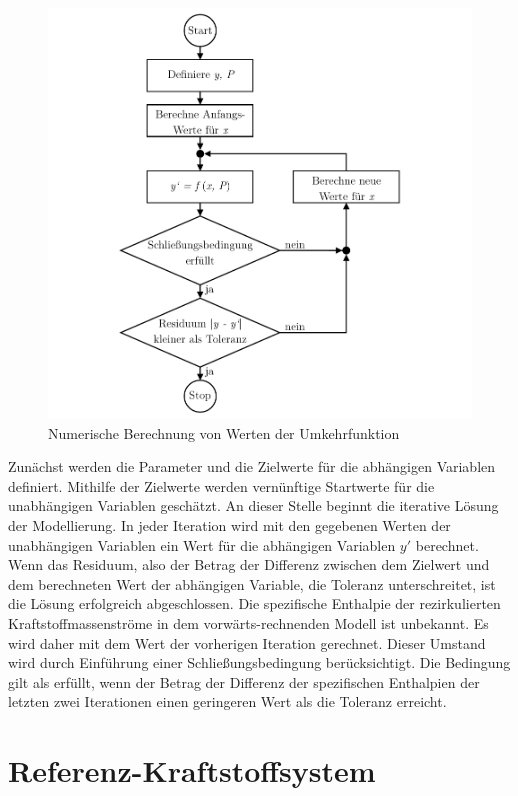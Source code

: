 \begin{figure}[ht]
\centering
\includegraphics[width=0.8\linewidth]{4_Abbildungen/2_Hauptteil/solver.pdf}
  \caption{Numerische Berechnung von Werten der Umkehrfunktion}
  \label{fig:solver}
\end{figure}
\FloatBarrier 

Zunächst werden die Parameter und die Zielwerte für die abhängigen Variablen definiert. Mithilfe der Zielwerte werden vernünftige Startwerte für die unabhängigen Variablen geschätzt. An dieser Stelle beginnt die iterative Lösung der Modellierung. In jeder Iteration wird mit den gegebenen Werten der unabhängigen Variablen ein Wert für die abhängigen Variablen $y'$ berechnet. Wenn das Residuum, also der Betrag der Differenz zwischen dem Zielwert und dem  berechneten Wert der abhängigen Variable, die Toleranz unterschreitet, ist die Lösung erfolgreich abgeschlossen. Die spezifische Enthalpie der rezirkulierten Kraftstoffmassenströme in dem vorwärts-rechnenden Modell ist unbekannt. Es wird daher mit dem Wert der vorherigen Iteration gerechnet. Dieser Umstand wird durch Einführung einer Schließungsbedingung berücksichtigt. Die Bedingung gilt als erfüllt, wenn der Betrag der Differenz der spezifischen Enthalpien der letzten zwei Iterationen einen geringeren Wert als die Toleranz erreicht.

\section{Referenz-Kraftstoffsystem}

